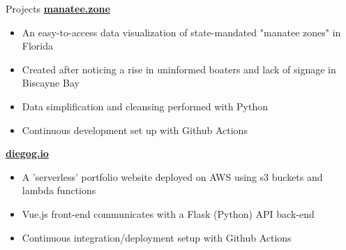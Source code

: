 \documentclass{res} %
\begin{document}
\begin{rSection}{Projects}
{\bf \href{https://manatee.zone}{manatee.zone}}
\begin{itemize}[leftmargin=*, topsep=-3pt] \itemsep -5pt
  \item An easy-to-access data visualization of state-mandated "manatee zones" in Florida
  \item Created after noticing a rise in uninformed boaters and lack of signage in Biscayne Bay
  \item Data simplification and cleansing performed with Python
  \item Continuous development set up with Github Actions
\end{itemize}

{\bf \href{https://diegog.io}{diegog.io}}
\begin{itemize}[leftmargin=*, topsep=-3pt] \itemsep -5pt
  \item A 'serverless' portfolio website deployed on AWS using s3 buckets and lambda functions
  \item Vue.js front-end communicates with a Flask (Python) API back-end
  \item Continuous integration/deployment setup with Github Actions
\end{itemize}

\end{rSection}
\end{document}
